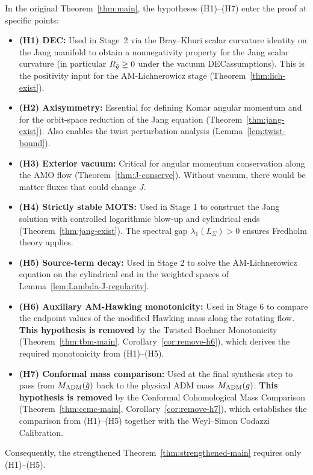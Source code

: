 \begin{remark}\label{rem:hypothesis-role}
In the original Theorem~\ref{thm:main}, the hypotheses (H1)--(H7) enter the proof at specific points:
\begin{itemize}
    \item \textbf{(H1) DEC:} Used in Stage~2 via the Bray--Khuri scalar curvature identity on the Jang manifold to obtain a nonnegativity property for the Jang scalar curvature (in particular $R_{\bar{g}}\ge 0$ under the vacuum DECassumptions). This is the positivity input for the AM-Lichnerowicz stage (Theorem~\ref{thm:lich-exist}).
    \item \textbf{(H2) Axisymmetry:} Essential for defining Komar angular momentum and for the orbit-space reduction of the Jang equation (Theorem~\ref{thm:jang-exist}). Also enables the twist perturbation analysis (Lemma~\ref{lem:twist-bound}).
    \item \textbf{(H3) Exterior vacuum:} Critical for angular momentum conservation along the AMO flow (Theorem~\ref{thm:J-conserve}). Without vacuum, there would be matter fluxes that could change $J$.
    \item \textbf{(H4) Strictly stable MOTS:} Used in Stage 1 to construct the Jang solution with controlled logarithmic blow-up and cylindrical ends (Theorem~\ref{thm:jang-exist}). The spectral gap $\lambda_1(L_\Sigma) > 0$ ensures Fredholm theory applies.
    \item \textbf{(H5) Source-term decay:} Used in Stage 2 to solve the AM-Lichnerowicz equation on the cylindrical end in the weighted spaces of Lemma~\ref{lem:Lambda-J-regularity}.
    \item \textbf{(H6) Auxiliary AM-Hawking monotonicity:} Used in Stage 6 to compare the endpoint values of the modified Hawking mass along the rotating flow. \textbf{This hypothesis is removed} by the Twisted Bochner Monotonicity (Theorem~\ref{thm:tbm-main}, Corollary~\ref{cor:remove-h6}), which derives the required monotonicity from (H1)--(H5).
    \item \textbf{(H7) Conformal mass comparison:} Used at the final synthesis step to pass from $M_{\mathrm{ADM}}(\tilde{g})$ back to the physical ADM mass $M_{\mathrm{ADM}}(g)$. \textbf{This hypothesis is removed} by the Conformal Cohomological Mass Comparison (Theorem~\ref{thm:ccmc-main}, Corollary~\ref{cor:remove-h7}), which establishes the comparison from (H1)--(H5) together with the Weyl--Simon Codazzi Calibration.
\end{itemize}
Consequently, the strengthened Theorem~\ref{thm:strengthened-main} requires only (H1)--(H5).
\end{remark}

